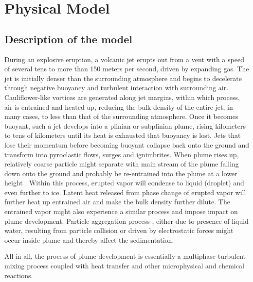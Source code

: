 \documentclass[journal abbreviation, manuscript]{copernicus}
\begin{document}
\section{Physical Model} \label{sec:physics-model}
\subsection{Description of the model}
During an explosive eruption, a volcanic jet erupts out from a vent with a speed of several tens to more than 150 meters per second, driven by expanding gas. The jet is initially denser than the surrounding atmosphere and begins to decelerate through negative buoyancy and turbulent interaction with surrounding air. Cauliflower-like vortices are generated along jet margins, within which process, air is entrained and heated up, reducing the bulk density of the entire jet, in many cases, to less than that of the surrounding atmosphere. Once it becomes buoyant, such a jet develops into a plinian or subplinian plume, rising kilometers to tens of kilometers until its heat is exhausted that buoyancy is lost. Jets that lose their momentum before becoming buoyant collapse back onto the ground and transform into pyroclastic flows, surges and ignimbrites. When plume rises up, relatively coarse particle might separate with main stream of the plume falling down onto the ground and probably be re-entrained into the plume at a lower height \citep{ernst1996sedimentation}. Within this process, erupted vapor will condense to liquid (droplet) and even further to ice. Latent heat released from phase change of erupted vapor will further heat up entrained air and make the bulk density further dilute. The entrained vapor might also experience a similar process and impose impact on plume development. Particle aggregation process \citep{carey1982influence,taddeucci2011aggregation}, either due to presence of liquid water, resulting from particle collision or driven by electrostatic forces might occur inside plume and thereby affect the sedimentation. 

All in all, the process of plume development is  essentially a multiphase turbulent mixing process coupled with heat transfer and  other microphysical and chemical reactions.
\end{document}
